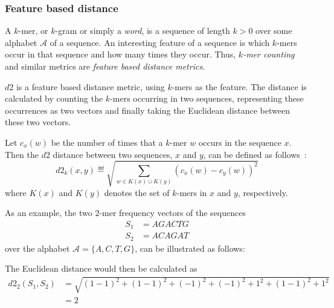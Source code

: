 \subsubsection{Feature based distance}

A $k$-mer, or $k$-gram or simply a \emph{word}, is a sequence of length $k > 0$
over some alphabet $\mathcal{A}$ of a sequence. An interesting feature of a
sequence is which $k$-mers occur in that sequence and how many times they
occur. Thus, \emph{$k$-mer counting} and similar metrics are \emph{feature
based distance metrics}.

$d2$ is a feature based distance metric, using $k$-mers as the feature. The
distance is calculated by counting the $k$-mers occurring in two sequences,
representing these occurrences as two vectors and finally taking the Euclidean
distance between these two vectors.~\cite[pp.~53-54]{dong}

Let $c_x(w)$ be the number of times that a $k$-mer $w$ occurs in the sequence
$x$. Then the $d2$ distance between two sequences, $x$ and $y$, can be defined
as follows~\cite[pp.~1-2]{hazelhurst}:
\begin{equation}
  d2_k(x,y) \eqdef \sqrt{\sum_{w \in K(x) \cup K(y)} (c_x(w) - c_y(w))^2}
\end{equation}
where $K(x)$ and $K(y)$ denotes the set of $k$-mers in $x$ and $y$,
respectively.

As an example, the two $2$-mer frequency vectors of the sequences
\begin{align*}
  S_1 &= AGACTG \\
  S_2 &= ACAGAT
\end{align*}
over the alphabet $\mathcal{A} = \{A,C,T,G\}$, can be illustrated as follows:

\begin{table}[!h]
\centering
{}
\end{table}

The Euclidean distance would then be calculated as
\begin{align*}
  d2_2(S_1, S_2)
    &= \sqrt{(1-1)^2 + (1-1)^2 + (-1)^2 + (-1)^2 + 1^2 + (1-1)^2 + 1^2} \\
    &= 2
\end{align*}

